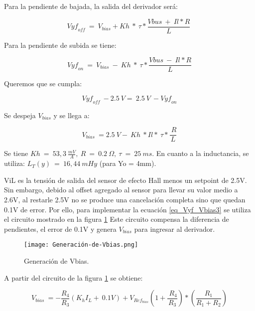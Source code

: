 \noindent Para la pendiente de bajada, la salida del derivador ser\'{a}:

\begin{equation} \label{eq_Vyf-Vbias}
	{Vyf}_{off}\ =\ V_{bias}+Kh\ *\ \tau *\frac{Vbus\ +\ Il*R}{L}\ 
\end{equation}

\noindent Para la pendiente de subida se tiene:

\begin{equation} \label{eq_Vyf-Vbias2}
	{Vyf}_{on}\ =\ V_{bias}\ -\ Kh\ *\ \tau *\frac{Vbus\ -\ Il*R}{L}
\end{equation}

\noindent Queremos que se cumpla:

\begin{equation} \label{eq_Vyf_Vbias3}
	{Vyf}_{off}\ -2.5\ V=\ 2.5\ V\ -{Vyf}_{on}
\end{equation}

\noindent Se despeja $V_{bias}$ y se llega a:

\begin{equation} \label{eq_Vyf-Vbias4}
	V_{bias}\ =2.5\ V-\ Kh\ *Il*\ \tau *\frac{\ R}{L}
\end{equation}

\noindent Se tiene $Kh\ =\ 53,3\ \frac{mV}{A},\ R\ =\ 0.2\ \mathit{\Omega},\ \tau \ =\ 25\ ms$. En cuanto a la inductancia, se utiliza:  $L_T(y)\ =\ 16,44\ mHy$ (para Yo = 4mm).

\noindent ViL es la tensi\'{o}n de salida del sensor de efecto Hall menos un setpoint de 2.5V. Sin embargo, debido al offset agregado al sensor para llevar su valor medio a 2.6V, al restarle 2.5V no se produce una cancelaci\'{o}n completa sino que quedan 0.1V de error. Por ello, para implementar la ecuaci\'{o}n  \ref{eq_Vyf_Vbias3} se utiliza el circuito mostrado en la figura \ref{fig:img_Generación_de_Vbias} Este circuito compensa la diferencia de pendientes, el error de 0.1V y genera $V_{bias}$ para ingresar al derivador.

\begin{figure}[H]
	\centering
	\texttt{[image: Generación-de-Vbias.png]}
	\caption{Generación de Vbias.}
	\label{fig:img_Generación_de_Vbias}
\end{figure}

\noindent A partir del circuito de la figura \ref{fig:img_Generación_de_Vbias} se obtiene:

\begin{equation} \label{eq_Vyf-Vbias3}
	V_{bias}\ =-\frac{R_4}{R_3}(K_hI_L+\ 0.1V)+V_{Ref_{bias}}(1+\frac{\ R_4}{R_3})*(\frac{R_1}{R_1+R_2})
\end{equation}

